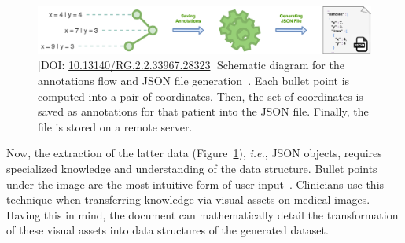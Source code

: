 \begin{figure}[htbp]
\centering
\includegraphics[width=\textwidth]{images/fig013}
\caption{[DOI: \href{https://doi.org/10.13140/rg.2.2.33967.28323}{10.13140/RG.2.2.33967.28323}] Schematic diagram for the annotations flow and JSON file generation~\cite{https://doi.org/10.13140/rg.2.2.33967.28323}. Each bullet point is computed into a pair of coordinates. Then, the set of coordinates is saved as annotations for that patient into the JSON file. Finally, the file is stored on a remote server.}
\label{fig:fig013}
\end{figure}

Now, the extraction of the latter data (Figure~\ref{fig:fig013}), {\it i.e.}, \ac{JSON} objects, requires specialized knowledge and understanding of the data structure.
Bullet points under the image are the most intuitive form of user input~\cite{10.1145/3132272.3134111, 10.1145/3399715.3399744}.
Clinicians use this technique when transferring knowledge via visual assets on medical images.
Having this in mind, the document can mathematically detail the transformation of these visual assets into data structures of the generated dataset.

